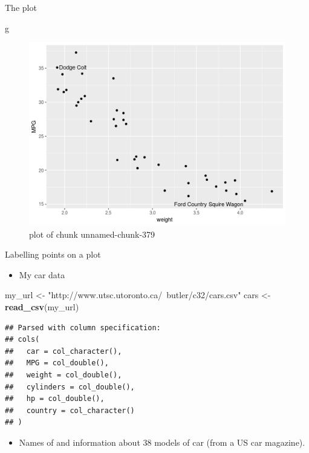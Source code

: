 \documentclass[ignorenonframetext,]{beamer}
\newenvironment{Shaded}{\begin{snugshade}}{\end{snugshade}}
\newcommand{\KeywordTok}[1]{\textcolor[rgb]{0.13,0.29,0.53}{\textbf{#1}}}
\newcommand{\NormalTok}[1]{#1}
\newcommand{\StringTok}[1]{\textcolor[rgb]{0.31,0.60,0.02}{#1}}
\providecommand{\tightlist}{%
  \setlength{\itemsep}{0pt}\setlength{\parskip}{0pt}}
\begin{document}
\begin{frame}[fragile]{The plot}
\protect\hypertarget{the-plot-4}{}

\begin{Shaded}
\begin{Highlighting}[]
\NormalTok{g}
\end{Highlighting}
\end{Shaded}

\begin{figure}
\centering
\includegraphics{figure/unnamed-chunk-379-1.png}
\caption{plot of chunk unnamed-chunk-379}
\end{figure}

\end{frame}

\begin{frame}[fragile]{Labelling points on a plot}
\protect\hypertarget{labelling-points-on-a-plot}{}

\begin{itemize}
\tightlist
\item
  My car data
\end{itemize}

\begin{Shaded}
\begin{Highlighting}[]
\NormalTok{my_url <-}\StringTok{ "http://www.utsc.utoronto.ca/~butler/c32/cars.csv"}
\NormalTok{cars <-}\StringTok{ }\KeywordTok{read_csv}\NormalTok{(my_url)}
\end{Highlighting}
\end{Shaded}

\begin{verbatim}
## Parsed with column specification:
## cols(
##   car = col_character(),
##   MPG = col_double(),
##   weight = col_double(),
##   cylinders = col_double(),
##   hp = col_double(),
##   country = col_character()
## )
\end{verbatim}

\begin{itemize}
\tightlist
\item
  Names of and information about 38 models of car (from a US car
  magazine).
\end{itemize}

\end{frame}
\end{document}

